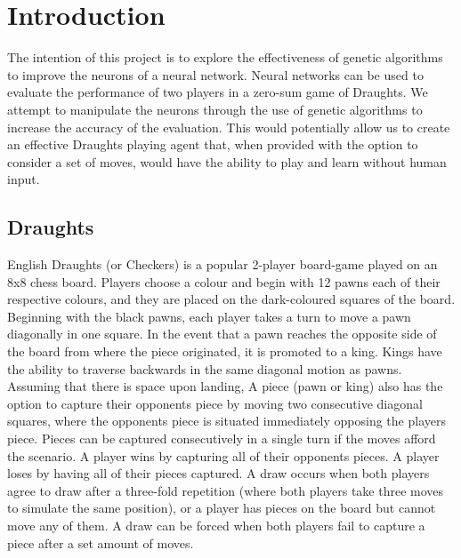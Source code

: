 \documentclass[12pt,a4paper]{article}
\begin{document}
\section{Introduction}

    The intention of this project is to explore the effectiveness of genetic algorithms to improve the neurons of a neural network. Neural networks can be used to evaluate the performance of two players in a zero-sum game of Draughts. We attempt to manipulate the neurons through the use of genetic algorithms to increase the accuracy of the evaluation. This would potentially allow us to create an effective Draughts playing agent that, when provided with the option to consider a set of moves, would have the ability to play and learn without human input.


    \subsection*{Draughts}

    English Draughts (or Checkers) is a popular 2-player board-game played on an 8x8 chess board. Players choose a colour and begin with 12 pawns each of their respective colours, and they are placed on the dark-coloured squares of the board. Beginning with the black pawns, each player takes a turn to move a pawn diagonally in one square. In the event that a pawn reaches the opposite side of the board from where the piece originated, it is promoted to a king. Kings have the ability to traverse backwards in the same diagonal motion as pawns. Assuming that there is space upon landing, A piece (pawn or king) also has the option to capture their opponents piece by moving two consecutive diagonal squares, where the opponents piece is situated immediately opposing the players piece. Pieces can be captured consecutively in a single turn if the moves afford the scenario. A player wins by capturing all of their opponents pieces. A player loses by having all of their pieces captured. A draw occurs when both players agree to draw after a three-fold repetition (where both players take three moves to simulate the same position), or a player has pieces on the board but cannot move any of them. A draw can be forced when both players fail to capture a piece after a set amount of moves.
\end{document}
